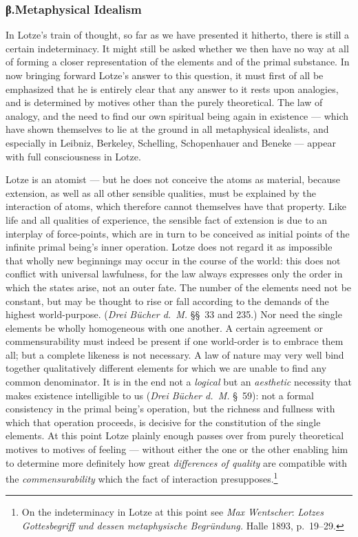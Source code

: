 \documentclass[12pt,a4paper]{book}
\newcommand{\opage}[1]{\marginnote{\footnotesize\textit{[#1]}}}
\begin{document}
\subsubsection*{β.\quad Metaphysical Idealism}

In Lotze's train of thought, so far as we have presented it hitherto, there is
still a certain indeterminacy. It might still be asked whether we then have no
way at all of forming a closer representation of the elements and of the primal
substance. In now bringing forward Lotze's answer to this question, it must first
of all be emphasized that he is entirely clear that any answer to it rests upon
analogies, and is determined by motives other than the purely theoretical. The
law of analogy, and the need to find our own spiritual being again in existence
--- which have shown themselves to lie at the ground in all metaphysical
idealists, and especially in Leibniz, Berkeley, Schelling, Schopenhauer and
Beneke --- appear with full consciousness in Lotze.

Lotze is an atomist --- but he does not conceive the atoms as material, because
extension, as well as all other sensible qualities, must be explained by the
interaction of atoms, which therefore cannot themselves have that property. Like
life and all qualities of experience, the sensible fact of extension is due to an
interplay of force-points, which are in turn to be conceived as initial points of
the infinite primal being's inner operation. Lotze does not regard it as
impossible that wholly new beginnings may occur in the course of the world: this
does \opage{518}not conflict with universal lawfulness, for the law always expresses only
the order in which the states arise, not an outer fate. The number of the
elements need not be constant, but may be thought to rise or fall according to
the demands of the highest world-purpose. (\textit{Drei Bücher d.~M.} §§~33 and
235.) Nor need the single elements be wholly homogeneous with one another. A
certain agreement or commensurability must indeed be present if one world-order
is to embrace them all; but a complete likeness is not necessary. A law of nature
may very well bind together qualitatively different elements for which we are
unable to find any common denominator. It is in the end not a \emph{logical} but
an \emph{aesthetic} necessity that makes existence intelligible to us
(\textit{Drei Bücher d.~M.} §~59): not a formal consistency in the primal being's
operation, but the richness and fullness with which that operation proceeds, is
decisive for the constitution of the single elements. At this point Lotze plainly
enough passes over from purely theoretical motives to motives of feeling ---
without either the one or the other enabling him to determine more definitely how
great \emph{differences of quality} are compatible with the
\emph{commensurability} which the fact of interaction
presupposes.\footnote{On the indeterminacy in Lotze at this point see \emph{Max Wentscher}: \textit{Lotzes Gottesbegriff und dessen metaphysische Begründung.}
Halle 1893, p.~19--29.}
\end{document}
